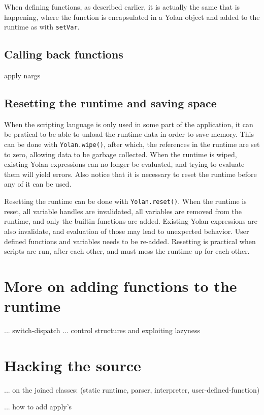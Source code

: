 When defining functions, as described earlier, it is actually the same that is happening, where the function is encapsulated in a Yolan object and added to the runtime as with \verb|setVar|.
\subsection{Calling back functions}
apply nargs
\subsection{Resetting the runtime and saving space}
When the scripting language is only used in some part of the application, it can be pratical to be able to unload the runtime data in order to save memory. This can be done with \verb|Yolan.wipe()|, after which, the references in the runtime are set to zero, allowing data to be garbage collected.
When the runtime is wiped, existing Yolan expressions can no longer be evaluated, and trying to evaluate them will yield errors. Also notice that it is necessary to reset the runtime before any of it can be used.

Resetting the runtime can be done with \verb|Yolan.reset()|. When the runtime is reset, all variable handles are invalidated, all variables are removed from the runtime, and only the builtin functions are added. Existing Yolan expressions are also invalidate, and evaluation of those may lead to unexpected behavior. User defined functions and variables needs to be re-added.
Resetting is practical when scripts are run, after each other, and must mess the runtime up for each other.

\section{More on adding functions to the runtime}
... switch-dispatch
... control structures and exploiting lazyness

\section{Hacking the source}
\label{j2mesource}
... on the joined classes: (static runtime, parser, interpreter, user-defined-function)

... how to add apply's

